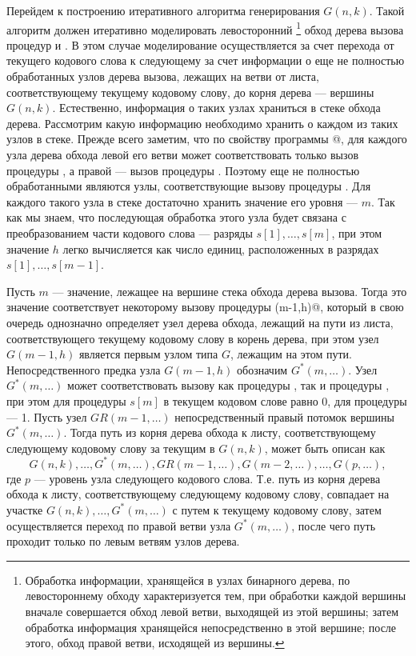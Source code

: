 \documentclass[12pt,a4paper]{article}
\theoremstyle{plain}
\theoremstyle{definition}
\theoremstyle{remark}
\begin{document}
Перейдем к построению итеративного алгоритма генерирования $G(n,k)$. Такой алгоритм должен итеративно моделировать левосторонний
\footnote{Обработка информации, хранящейся в узлах бинарного дерева, по левостороннему обходу характеризуется тем, при обработки каждой вершины вначале совершается обход левой ветви, выходящей из этой вершины; затем обработка информация хранящейся непосредственно в этой вершине; после этого, обход правой ветви, исходящей из вершины.}
обход дерева вызова процедур \verb@G@ и \verb@GR@. В этом случае моделирование осуществляется за счет перехода от текущего кодового слова к следующему за счет информации о еще не полностью обработанных узлов дерева вызова, лежащих на ветви от листа, соответствующему текущему кодовому слову, до корня дерева --- вершины $G(n,k)$. Естественно, информация о таких узлах храниться в стеке обхода дерева. Рассмотрим какую информацию необходимо хранить о каждом из таких узлов в стеке. Прежде всего заметим, что по свойству программы @, для каждого узла дерева обхода левой его ветви может соответствовать только вызов процедуры \verb@G@, а правой --- вызов процедуры \verb@GR@. Поэтому еще не полностью обработанными являются узлы, соответствующие вызову процедуры \verb@G@. Для каждого такого узла в стеке достаточно хранить значение его уровня --- $m$. Так как мы знаем, что последующая обработка этого узла будет связана с преобразованием части кодового слова --- разряды $s[1],\ldots,s[m]$, при этом значение $h$ легко вычисляется как число единиц, расположенных в разрядах $s[1],\ldots,s[m-1]$.

Пусть $m$ --- значение, лежащее на вершине стека обхода дерева вызова. Тогда это значение соответствует некоторому вызову процедуры \verb@G(m-1,h)@, который в свою очередь однозначно определяет узел дерева обхода, лежащий на пути из листа, соответствующего текущему кодовому слову в корень дерева, при этом узел $G(m-1,h)$ является первым узлом типа $G$, лежащим на этом пути. Непосредственного предка узла $G(m-1,h)$ обозначим $G^*(m,\ldots)$. Узел $G^*(m,\ldots)$ может соответствовать вызову как процедуры \verb@G@, так и процедуры \verb@GR@, при этом для процедуры \verb@G@ $s[m]$ в текущем кодовом слове равно 0, для процедуры \verb@GR@ --- 1. Пусть узел $GR(m-1,\ldots)$ непосредственный правый потомок вершины $G^*(m,\ldots)$. Тогда путь из корня дерева обхода к листу, соответствующему следующему кодовому слову за текущим в $G(n,k)$, может быть описан как
\[ G(n,k),\ldots,G^*(m,\ldots), GR(m-1,\ldots), G(m-2,\ldots),\ldots,G(p,\ldots),\]
где $p$ --- уровень узла следующего кодового слова. Т.е. путь из корня дерева обхода к листу, соответствующему следующему кодовому слову, совпадает на участке $G(n,k),\ldots, G^*(m,\ldots)$ с путем к текущему кодовому слову, затем осуществляется переход по правой ветви узла $G^*(m,\ldots)$, после чего путь проходит только по левым ветвям узлов дерева.
\end{document}
